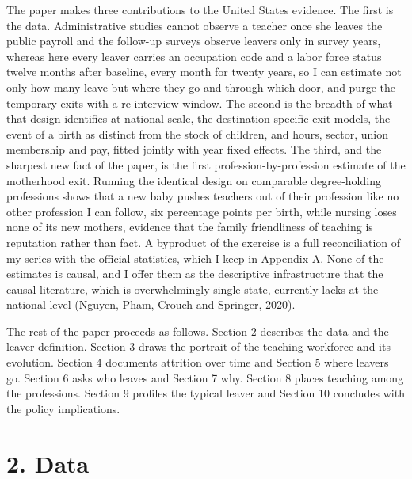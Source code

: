 \documentclass[11pt,a4paper]{article}
\begin{document}
The paper makes three contributions to the United States evidence. The
first is the data. Administrative studies cannot observe a teacher once
she leaves the public payroll and the follow-up surveys observe leavers
only in survey years, whereas here every leaver carries an occupation
code and a labor force status twelve months after baseline, every month
for twenty years, so I can estimate not only how many leave but where
they go and through which door, and purge the temporary exits with a
re-interview window. The second is the breadth of what that design
identifies at national scale, the destination-specific exit models, the
event of a birth as distinct from the stock of children, and hours,
sector, union membership and pay, fitted jointly with year fixed
effects. The third, and the sharpest new fact of the paper, is the first
profession-by-profession estimate of the motherhood exit. Running the
identical design on comparable degree-holding professions shows that a
new baby pushes teachers out of their profession like no other
profession I can follow, six percentage points per birth, while nursing
loses none of its new mothers, evidence that the family friendliness of
teaching is reputation rather than fact. A byproduct of the exercise is
a full reconciliation of my series with the official statistics, which I
keep in Appendix A. None of the estimates is causal, and I offer them
as the descriptive infrastructure that the causal literature, which is
overwhelmingly single-state, currently lacks at the national level
(Nguyen, Pham, Crouch and Springer, 2020).

The rest of the paper proceeds as follows. Section 2 describes the data
and the leaver definition. Section 3 draws the portrait of the teaching
workforce and its evolution. Section 4 documents attrition over time and
Section 5 where leavers go. Section 6 asks who leaves and Section 7 why.
Section 8 places teaching among the professions. Section 9 profiles the
typical leaver and Section 10 concludes with the policy implications.

\section*{2. Data}
\end{document}
